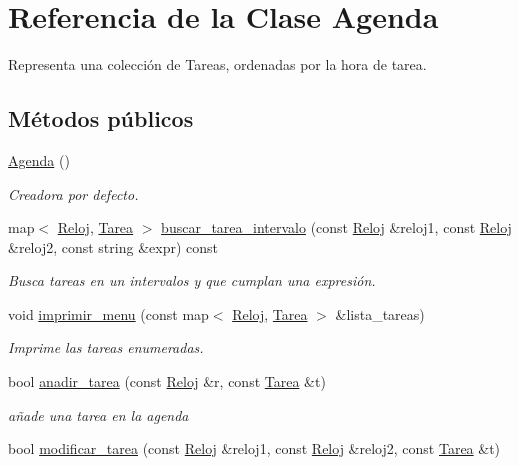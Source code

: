 \hypertarget{class_agenda}{\section{Referencia de la Clase Agenda}
\label{class_agenda}
}


Representa una colección de Tareas, ordenadas por la hora de tarea.  


\subsection*{Métodos públicos}
\begin{DoxyCompactItemize}
\item 
\hyperlink{class_agenda_a6685054d2b4ccbf2a4ef2ac5e3746bc3}{Agenda} ()
\begin{DoxyCompactList}\small\item\em Creadora por defecto. \end{DoxyCompactList}\item 
map$<$ \hyperlink{class_reloj}{Reloj}, \hyperlink{class_tarea}{Tarea} $>$ \hyperlink{class_agenda_a82ce91d05bf272a3c0ead42fc64e84aa}{buscar\-\_\-tarea\-\_\-intervalo} (const \hyperlink{class_reloj}{Reloj} \&reloj1, const \hyperlink{class_reloj}{Reloj} \&reloj2, const string \&expr) const 
\begin{DoxyCompactList}\small\item\em Busca tareas en un intervalos y que cumplan una expresión. \end{DoxyCompactList}\item 
void \hyperlink{class_agenda_a755177707be90968dedb6ff36647c3af}{imprimir\-\_\-menu} (const map$<$ \hyperlink{class_reloj}{Reloj}, \hyperlink{class_tarea}{Tarea} $>$ \&lista\-\_\-tareas)
\begin{DoxyCompactList}\small\item\em Imprime las tareas enumeradas. \end{DoxyCompactList}\item 
bool \hyperlink{class_agenda_aeba776d0394a5cc0da53e7955d713133}{anadir\-\_\-tarea} (const \hyperlink{class_reloj}{Reloj} \&r, const \hyperlink{class_tarea}{Tarea} \&t)
\begin{DoxyCompactList}\small\item\em añade una tarea en la agenda \end{DoxyCompactList}\item 
bool \hyperlink{class_agenda_aecbb7c1af5d9816012ba9b6b7c5f3bfe}{modificar\-\_\-tarea} (const \hyperlink{class_reloj}{Reloj} \&reloj1, const \hyperlink{class_reloj}{Reloj} \&reloj2, const \hyperlink{class_tarea}{Tarea} \&t)

\end{DoxyCompactItemize}
